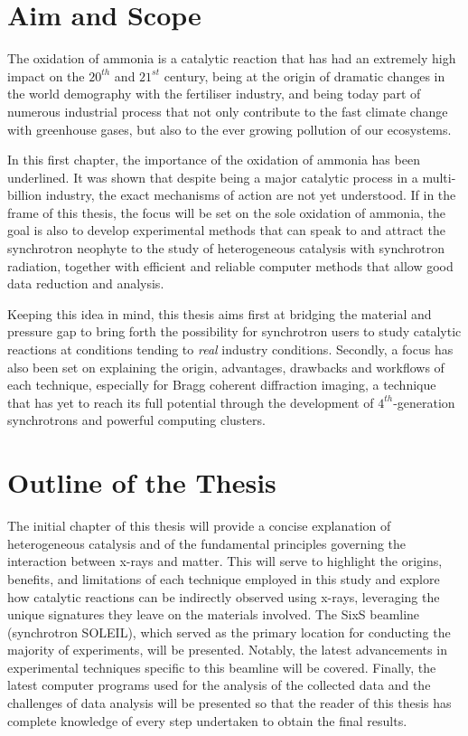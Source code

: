 \section{Aim and Scope}

The oxidation of ammonia is a catalytic reaction that has had an extremely high impact on the $20^{th}$ and $21^{st}$ century, being at the origin of dramatic changes in the world demography with the fertiliser industry, and being today part of numerous industrial process that not only contribute to the fast climate change with greenhouse gases, but also to the ever growing pollution of our ecosystems.

In this first chapter, the importance of the oxidation of ammonia has been underlined.
It was shown that despite being a major catalytic process in a multi-billion industry, the exact mechanisms of action are not yet understood.
If in the frame of this thesis, the focus will be set on the sole oxidation of ammonia, the goal is also to develop experimental methods that can speak to and attract the synchrotron neophyte to the study of heterogeneous catalysis with synchrotron radiation, together with efficient and reliable computer methods that allow good data reduction and analysis.

Keeping this idea in mind, this thesis aims first at bridging the material and pressure gap to bring forth the possibility for synchrotron users to study catalytic reactions at conditions tending to \textit{real} industry conditions.
Secondly, a focus has also been set on explaining the origin, advantages, drawbacks and workflows of each technique, especially for Bragg coherent diffraction imaging, a technique that has yet to reach its full potential through the development of $4^{th}$-generation synchrotrons and powerful computing clusters.

\section{Outline of the Thesis}

The initial chapter of this thesis will provide a concise explanation of heterogeneous catalysis and of the fundamental principles governing the interaction between x-rays and matter.
This will serve to highlight the origins, benefits, and limitations of each technique employed in this study and explore how catalytic reactions can be indirectly observed using x-rays, leveraging the unique signatures they leave on the materials involved.
The SixS beamline (synchrotron SOLEIL), which served as the primary location for conducting the majority of experiments, will be presented.
Notably, the latest advancements in experimental techniques specific to this beamline will be covered.
Finally, the latest computer programs used for the analysis of the collected data and the challenges of data analysis will be presented so that the reader of this thesis has complete knowledge of every step undertaken to obtain the final results.

